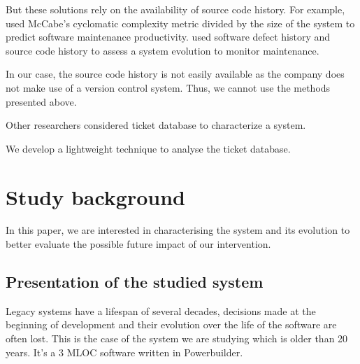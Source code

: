 \documentclass[10pt,conference]{IEEEtran}
\begin{document}

But these solutions rely on the availability of source code history. 
For example, \cite{gill91} used McCabe’s cyclomatic complexity metric divided by the size of the system to predict software maintenance productivity.
\cite{port18,Zhan10a} used software defect history and source code history to assess a system evolution to monitor maintenance. 

In our case, the source code history is not easily available as the company does not make use of a version control system.
Thus, we cannot use the methods presented above.

Other researchers considered ticket database to characterize a system.


We develop a lightweight technique to analyse the ticket database.


\section{Study background}
\label{sec:defectModel}

In this paper, we are interested in characterising the system and its evolution to better evaluate the possible future impact of our intervention. 

\subsection{Presentation of the studied system}

Legacy systems have a lifespan of several decades, decisions made at the beginning of development and their evolution over the life of the software are often lost. 
This is the case of the system we are studying which is older than 20 years. 
It's a 3 MLOC software written in Powerbuilder.
\end{document}
